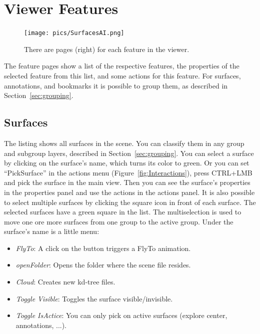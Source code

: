 \section{Viewer Features}

\begin{figure}[h]
    	\centering
    		\texttt{[image: pics/SurfacesAI.png]}
    	\caption[Viewer Features]{There are pages (right) for each feature in the viewer.}
    	\label{fig:featureMenu}
   \end{figure}
	
The feature pages show a list of the respective features, the properties of the selected feature from this list, and some actions for this feature.
For surfaces, annotations, and bookmarks it is possible to group them, as described in Section~\ref{sec:grouping}.
\subsection{Surfaces}
\label{sec:surfaces}

The listing shows all surfaces in the scene. You can classify them in any group and subgroup layers, described in Section~\ref{sec:grouping}.
You can select a surface by clicking on the surface's name, which turns its color to green. Or you can set ``PickSurface'' in the actions menu (Figure~\ref{fig:Interactions}), press CTRL+LMB and pick the surface in the main view. Then you can see the surface's properties in the properties panel and use the actions in the actions panel. 
It is also possible to select multiple surfaces by clicking the square icon in front of each surface. The selected surfaces have a green square in the list. The multiselection is used to move one ore more surfaces from one group to the active group.
Under the surface's name is a little menu:
\begin{itemize}
	\item \textit{FlyTo}: A click on the button triggers a FlyTo animation.
	\item \textit{openFolder}: Opens the folder where the scene file resides.	
	\item \textit{Cloud}: Creates new kd-tree files.	
	\item \textit{Toggle Visible}: Toggles the surface visible/invisible.	
	\item \textit{Toggle IsActice}: You can only pick on active surfaces (explore center, annotations, ...).
	
\end{itemize}

